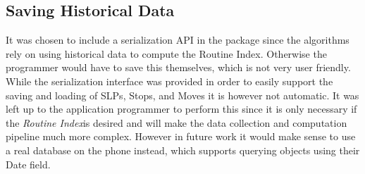 \subsection{Saving Historical Data}
It was chosen to include a serialization API in the package since the algorithms rely on using historical data to compute the Routine Index. Otherwise the programmer would have to save this themselves, which is not very user friendly. While the serialization interface was provided in order to easily support the saving and loading of SLPs, Stops, and Moves it is however not automatic. It was left up to the application programmer to perform this since it is only necessary if the \textit{Routine Index}is desired and will make the data collection and computation pipeline much more complex. However in future work it would make sense to use a real database on the phone instead, which supports querying objects using their Date field.  